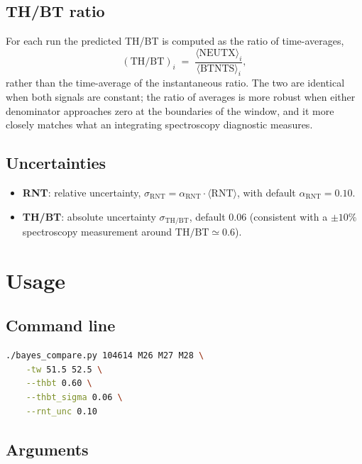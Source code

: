 \documentclass[11pt,a4paper]{article}
\begin{document}
\subsection{TH/BT ratio}

For each run the predicted TH/BT is computed as the ratio of
time-averages,
\begin{equation}
    (\text{TH/BT})_i \;=\;
        \frac{\langle \text{NEUTX} \rangle_i}
             {\langle \text{BTNTS} \rangle_i},
\end{equation}
rather than the time-average of the instantaneous ratio. The two are
identical when both signals are constant; the ratio of averages is more
robust when either denominator approaches zero at the boundaries of the
window, and it more closely matches what an integrating
spectroscopy diagnostic measures.

\subsection{Uncertainties}

\begin{itemize}
    \item \textbf{RNT}: relative uncertainty,
          $\sigma_{\text{RNT}} = \alpha_{\text{RNT}} \cdot \langle \text{RNT} \rangle$,
          with default $\alpha_{\text{RNT}} = 0.10$.
    \item \textbf{TH/BT}: absolute uncertainty $\sigma_{\text{TH/BT}}$,
          default $0.06$ (consistent with a $\pm 10\%$ spectroscopy
          measurement around $\text{TH/BT} \simeq 0.6$).
\end{itemize}

\section{Usage}

\subsection{Command line}

\begin{lstlisting}[language=bash]
./bayes_compare.py 104614 M26 M27 M28 \
    -tw 51.5 52.5 \
    --thbt 0.60 \
    --thbt_sigma 0.06 \
    --rnt_unc 0.10
\end{lstlisting}

\subsection{Arguments}
\end{document}
